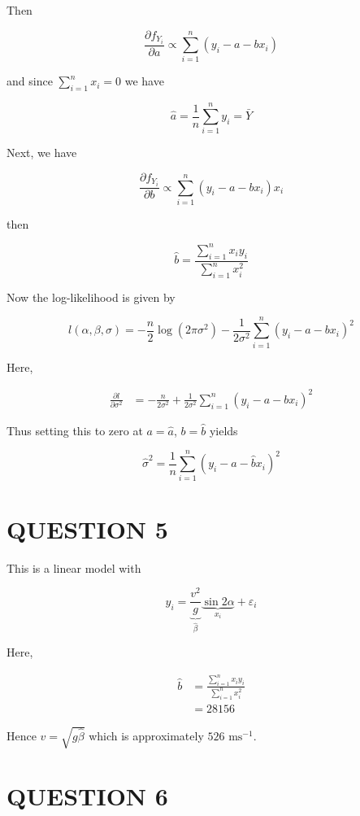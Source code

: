 \documentclass[a4paper]{article}
\begin{document}
Then

\[ \frac{\partial f_{Y_{i}} }{\partial a} \propto \sum_{i=1}^{n} ( y_{i} - a - bx_{i})  \]

and since $ \sum_{i=1}^{n} x_{i} = 0 $ we have 

\[ \hat{a} = \frac{1}{n} \sum_{i=1}^{n} y_{i} = \bar{Y}  \]

Next, we have 

\[ \frac{\partial f_{Y_{i}} }{\partial b} \propto \sum_{i=1}^{n} ( y_{i} - a - bx_{i})x_{i}  \]

then

\[ \hat{b} = \frac{\sum_{i=1}^{n} x_{i}y_{i} }{\sum_{i=1}^{n} x_{i}^{2} } \]

Now the log-likelihood is given by

\[ l(\alpha,\beta,\sigma) = - \frac{n}{2} \log(2 \pi \sigma^{2}) - \frac{1}{2 \sigma^{2}} \sum_{i=1}^{n} ( y_{i} - a - bx_{i})^{2}   \]

Here,

\begin{align*}
\frac{\partial l }{\partial \sigma^{2}} & = - \frac{n}{2 \sigma^{2}} + \frac{1}{2 \sigma^{2}} \sum_{i=1}^{n} ( y_{i} - a - bx_{i})^{2}
\end{align*}

Thus setting this to zero at $ a = \hat{a} $, $ b = \hat{b} $ yields

\[ \hat{\sigma}^{2} = \frac{1}{n} \sum_{i=1}^{n} ( y_{i} - \hat{a} - \hat{b} x_{i})^{2} \]



\section{QUESTION 5}

This is a linear model with 

\[ y_{i} = \underbrace{\frac{v^{2}}{g}}_{\hat{\beta}} \underbrace{\sin 2\alpha}_{x_{i}} + \varepsilon_{i} \]


Here,

\begin{align*}
\hat{b} & = \frac{\sum_{i=1}^{n} x_{i}y_{i} }{\sum_{i=1}^{n} x_{i}^{2} }\\
& = 28156
\end{align*}

Hence $ v = \sqrt{g \hat{\beta} } $ which is approximately $ 526 \text{ ms}^{-1} $.





\section{QUESTION 6}
\end{document}
